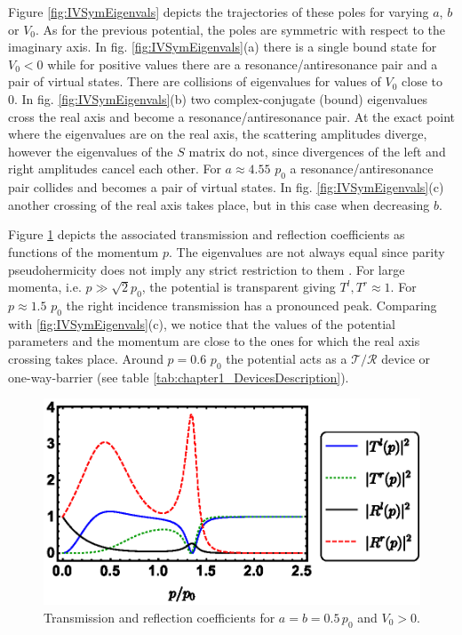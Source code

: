 Figure \ref{fig:IVSymEigenvals} depicts the trajectories of these poles for varying $a$, $b$ or $V_0$. As for the previous potential, the poles are symmetric with respect to the imaginary axis. In fig. \ref{fig:IVSymEigenvals}(a) there is a single bound state for $V_0<0$ while for positive values there are a resonance/antiresonance pair and a pair of virtual states. There are collisions of eigenvalues for values of $V_0$ close to 0. In fig. \ref{fig:IVSymEigenvals}(b)  two complex-conjugate (bound) eigenvalues cross the real axis and become a resonance/antiresonance pair. At the exact point where the eigenvalues are on the real axis, the scattering amplitudes diverge, however the eigenvalues of the $S$ matrix do not, since divergences of the left and right amplitudes cancel each other. For $a  \approx 4.55$ $p_0$ a resonance/antiresonance pair collides and becomes a pair of virtual states. In fig. \ref{fig:IVSymEigenvals}(c) another crossing of the real axis takes place, but in this case when decreasing $b$.

Figure \ref{fig:T_R_fig2} depicts the associated transmission and reflection coefficients as functions of the momentum $p$. The eigenvalues are not always equal since parity pseudohermicity does not imply any strict restriction to them \cite{Ruschhaupt2017}. For large  momenta, i.e. $p \gg \sqrt{2} p_0$, the potential is transparent giving $T^l,T^r \approx 1$. For $p\approx 1.5$ $p_0$ the right incidence transmission has a pronounced peak. Comparing with \ref{fig:IVSymEigenvals}(c), we notice that the values of the potential parameters and the momentum are close to the ones for which the real axis crossing takes place. Around $p = 0.6$ $p_0$ the potential acts as a $\mathcal{T}/\mathcal{R}$ device or one-way-barrier (see table \ref{tab:chapter1_DevicesDescription}).


\begin{figure}[t]
\begin{center}
  \includegraphics[width=0.9\linewidth]{Figures/IVSymTR.eps}
\end{center}
\caption{ Transmission and reflection coefficients for $a=b=0.5\, p_0$ and $V_0>0$.}
\label{fig:T_R_fig2}
\end{figure}


